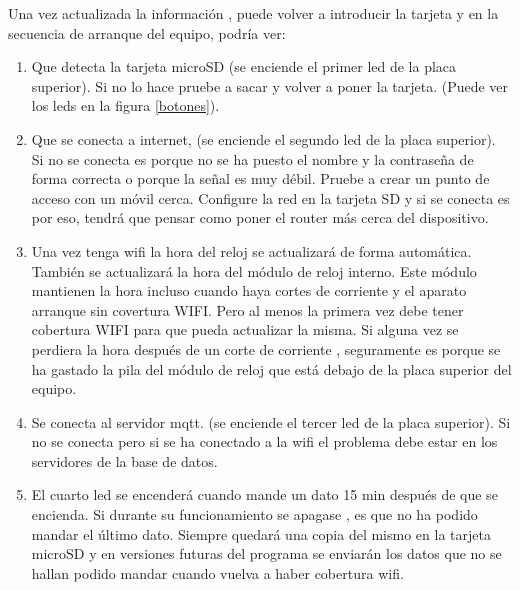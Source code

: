 Una vez actualizada la información , puede volver a introducir la tarjeta y en la secuencia de arranque del equipo, podría ver:
\begin{enumerate}
\item Que detecta la tarjeta microSD (se enciende el primer led de la placa superior). Si no lo hace pruebe a sacar y volver a poner la tarjeta. (Puede ver los leds en la figura \ref{botones}).
\item Que se conecta a internet, (se enciende el segundo led de la placa superior). Si no se conecta es porque no se ha puesto el nombre y la contraseña de forma correcta o porque la señal es muy débil. Pruebe a crear un punto de acceso con un móvil cerca. Configure la red en la tarjeta SD y si se conecta es por eso, tendrá que pensar como poner el router más cerca del dispositivo.
\item Una vez tenga wifi la hora del reloj se actualizará de forma automática. También se actualizará la hora del módulo de reloj interno. Este módulo mantienen la hora incluso cuando haya cortes de corriente y el aparato arranque sin covertura WIFI. Pero al menos la primera vez debe tener cobertura WIFI para que pueda actualizar la misma. Si alguna vez se perdiera la hora después de un corte de corriente , seguramente es porque se ha gastado la pila del módulo de reloj que está debajo de la placa superior del equipo. 
\item Se conecta al servidor mqtt. (se enciende el tercer led de la placa superior). Si no se conecta pero si se ha conectado a la wifi el problema debe estar en los servidores de la base de datos.
\item El cuarto led se encenderá cuando mande un dato 15 min después de que se encienda. Si durante su funcionamiento se apagase , es que no ha podido mandar el último dato. Siempre quedará una copia del mismo en la tarjeta microSD y en versiones futuras del programa se enviarán los datos que no se hallan podido mandar cuando vuelva a haber cobertura wifi.
\end{enumerate}

